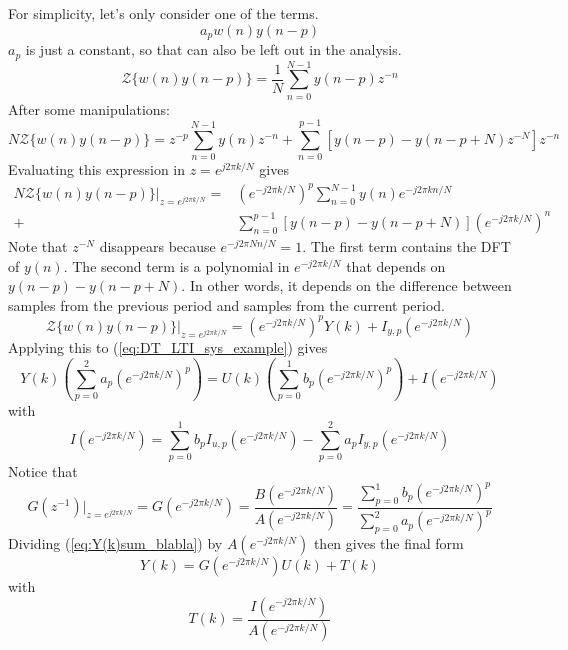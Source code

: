 For simplicity, let's only consider one of the terms.
\begin{equation*}
    a_p w(n) y(n-p)
\end{equation*}
$a_p$ is just a constant, so that can also be left out in the analysis.
\begin{equation*}
    \mathcal{Z}\{w(n) y(n-p)\} = \frac{1}{N}\sum_{n=0}^{N-1} y(n-p) z^{-n}
\end{equation*}
After some manipulations:
\begin{equation*}
    N \mathcal{Z}\{w(n) y(n-p)\} = z^{-p} \sum_{n=0}^{N-1} y(n) z^{-n} + \sum_{n=0}^{p-1} [y(n-p) - y(n-p+N) z^{-N}] z^{-n}
\end{equation*}
Evaluating this expression in $z = e^{j 2 \pi k /N}$ gives
\begin{align*}
	N \mathcal{Z}\{w(n) y(n-p)\}\rvert_{z=e^{j 2 \pi k/N}} =& (e^{-j 2 \pi k/N})^p \sum_{n=0}^{N-1} y(n) e^{-j 2 \pi k n/N}\\  + & \sum_{n=0}^{p-1} [y(n-p) - y(n-p+N)] (e^{-j 2 \pi k/N})^n
\end{align*}
Note that $z^{-N}$ disappears because $e^{-j 2 \pi N n/N} = 1$. The first term contains the DFT of $y(n)$. The second term is a polynomial in $e^{-j 2 \pi k/N}$ that depends on $y(n-p)-y(n-p+N)$. In other words, it depends on the difference between samples from the previous period and samples from the current period.
\begin{equation*}
     \mathcal{Z}\{w(n) y(n-p)\}\rvert_{z=e^{j 2 \pi k/N}} = (e^{-j 2 \pi k/N})^p Y(k)  + I_{y,p}(e^{-j 2 \pi k/N})
\end{equation*}
Applying this to (\ref{eq:DT_LTI_sys_example}) gives
\begin{equation}
    Y(k) (\sum_{p=0}^2 a_p (e^{-j 2 \pi k/N})^p) = U(k) (\sum_{p=0}^1 b_p (e^{-j 2 \pi k/N})^p) + I(e^{-j 2 \pi k/N})
    \label{eq:Y(k)sum_blabla}
\end{equation}
with
\begin{equation}
    I(e^{-j 2 \pi k/N}) = \sum_{p=0}^1 b_p I_{u,p}(e^{-j 2 \pi k/N}) - \sum_{p=0}^2 a_p I_{y,p}(e^{-j 2 \pi k/N})
    \label{eq:I_explicit}
\end{equation}
Notice that
\begin{equation*}
    G(z^{-1})\rvert_{z=e^{j 2 \pi k/N}} = G(e^{-j 2 \pi k/N}) = \frac{B(e^{-j 2 \pi k/N})}{A(e^{-j 2 \pi k/N})} =  \frac{\sum_{p=0}^1 b_p (e^{-j 2 \pi k/N})^p}{\sum_{p=0}^2 a_p (e^{-j 2 \pi k/N})^p}
\end{equation*}
Dividing (\ref{eq:Y(k)sum_blabla}) by $A(e^{-j 2 \pi k/N})$ then gives the final form
\begin{equation}
\boxed{
    Y(k) = G(e^{-j 2 \pi k/N}) U(k) + T(k)
    }
\end{equation}
with
\begin{equation*}
    T(k) = \frac{I(e^{-j 2 \pi k/N})}{A(e^{-j 2 \pi k/N})}
\end{equation*}


